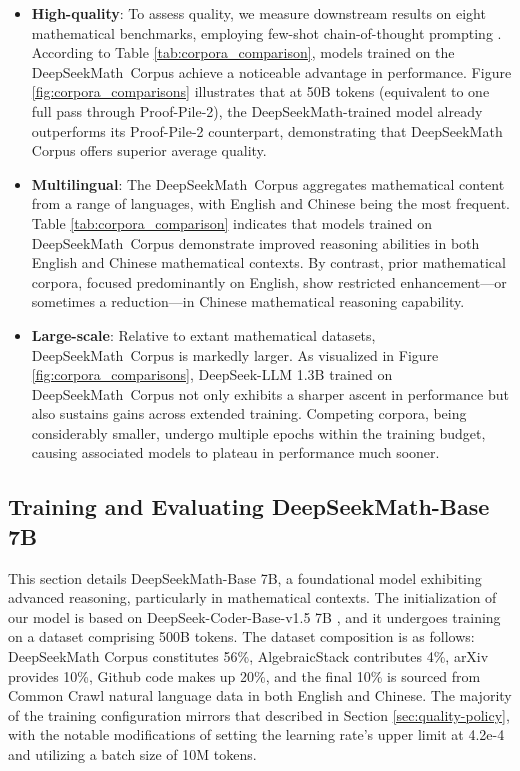 \begin{itemize}[topsep=0pt]
    \item \textbf{High-quality}:
    To assess quality, we measure downstream results on eight mathematical benchmarks, employing few-shot chain-of-thought prompting \cite{cot}. According to Table \ref{tab:corpora_comparison}, models trained on the DeepSeekMath~Corpus achieve a noticeable advantage in performance. Figure \ref{fig:corpora_comparisons} illustrates that at 50B tokens (equivalent to one full pass through Proof-Pile-2), the DeepSeekMath-trained model already outperforms its Proof-Pile-2 counterpart, demonstrating that DeepSeekMath Corpus offers superior average quality.
    \item \textbf{Multilingual}:
    The DeepSeekMath~Corpus aggregates mathematical content from a range of languages, with English and Chinese being the most frequent. Table \ref{tab:corpora_comparison} indicates that models trained on DeepSeekMath~Corpus demonstrate improved reasoning abilities in both English and Chinese mathematical contexts. By contrast, prior mathematical corpora, focused predominantly on English, show restricted enhancement—or sometimes a reduction—in Chinese mathematical reasoning capability.
    \item \textbf{Large-scale}:
    Relative to extant mathematical datasets, DeepSeekMath~Corpus is markedly larger. As visualized in Figure \ref{fig:corpora_comparisons}, DeepSeek-LLM 1.3B trained on DeepSeekMath~Corpus not only exhibits a sharper ascent in performance but also sustains gains across extended training. Competing corpora, being considerably smaller, undergo multiple epochs within the training budget, causing associated models to plateau in performance much sooner.
\end{itemize}

\subsection{Training and Evaluating DeepSeekMath-Base 7B}

This section details DeepSeekMath-Base 7B, a foundational model exhibiting advanced reasoning, particularly in mathematical contexts. The initialization of our model is based on DeepSeek-Coder-Base-v1.5 7B \citep{deepseek-coder}, and it undergoes training on a dataset comprising 500B tokens. The dataset composition is as follows: DeepSeekMath Corpus constitutes 56\%, AlgebraicStack contributes 4\%, arXiv provides 10\%, Github code makes up 20\%, and the final 10\% is sourced from Common Crawl natural language data in both English and Chinese. The majority of the training configuration mirrors that described in Section \ref{sec:quality-policy}, with the notable modifications of setting the learning rate’s upper limit at 4.2e-4 and utilizing a batch size of 10M tokens.

